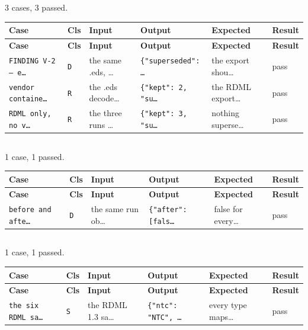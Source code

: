 \subsection*{}
{\small 3 cases, 3 passed.}\par
{\small
\begin{xltabular}{\linewidth}{|X|l|l|l|l|l|}
\toprule \textbf{Case} & \textbf{Cls} & \textbf{Input} & \textbf{Output} & \textbf{Expected} & \textbf{Result} \\\midrule\endfirsthead
\toprule \textbf{Case} & \textbf{Cls} & \textbf{Input} & \textbf{Output} & \textbf{Expected} & \textbf{Result} \\\midrule\endhead
\texttt{FINDING V-2 — e…} & \texttt{D} & the same .eds, … & \texttt{\{"superseded": …} & the export shou… & pass \\
\texttt{vendor containe…} & \texttt{R} & the .eds decode… & \texttt{\{"kept": 2, "su…} & the RDML export… & pass \\
\texttt{RDML only, no v…} & \texttt{R} & the three runs … & \texttt{\{"kept": 3, "su…} & nothing superse… & pass \\
\bottomrule
\end{xltabular}}

\subsection*{}
{\small 1 case, 1 passed.}\par
{\small
\begin{xltabular}{\linewidth}{|X|l|l|l|l|l|}
\toprule \textbf{Case} & \textbf{Cls} & \textbf{Input} & \textbf{Output} & \textbf{Expected} & \textbf{Result} \\\midrule\endfirsthead
\toprule \textbf{Case} & \textbf{Cls} & \textbf{Input} & \textbf{Output} & \textbf{Expected} & \textbf{Result} \\\midrule\endhead
\texttt{before and afte…} & \texttt{D} & the same run ob… & \texttt{\{"after": [fals…} & false for every… & pass \\
\bottomrule
\end{xltabular}}

\subsection*{}
{\small 1 case, 1 passed.}\par
{\small
\begin{xltabular}{\linewidth}{|X|l|l|l|l|l|}
\toprule \textbf{Case} & \textbf{Cls} & \textbf{Input} & \textbf{Output} & \textbf{Expected} & \textbf{Result} \\\midrule\endfirsthead
\toprule \textbf{Case} & \textbf{Cls} & \textbf{Input} & \textbf{Output} & \textbf{Expected} & \textbf{Result} \\\midrule\endhead
\texttt{the six RDML sa…} & \texttt{S} & the RDML 1.3 sa… & \texttt{\{"ntc": "NTC", …} & every type maps… & pass \\
\bottomrule
\end{xltabular}}

